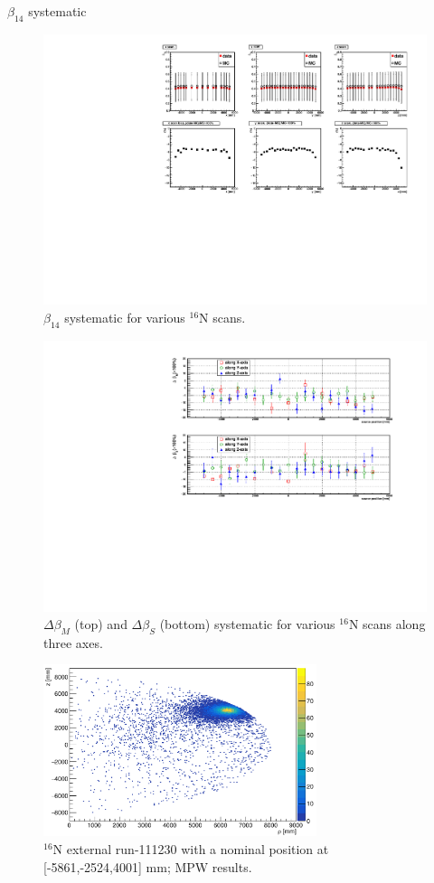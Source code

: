 $\beta_{14}$ systematic
\begin{figure}[htbp]
	\centering
	\includegraphics[width=15cm]{beta14_allScans.pdf}
	\caption{$\beta_{14}$ systematic for various $^{16}$N scans.}
	\label{beta14_scans}
\end{figure}

\begin{figure}[htbp]
	\centering
	\includegraphics[width=16cm]{angularResol_scanXYZ.pdf}
	\caption{$\Delta\beta_{M}$ (top) and $\Delta\beta_{S}$ (bottom) systematic for various $^{16}$N scans along three axes.}
	\label{xyzScans}
\end{figure}

\begin{figure}[!htb]
	\centering
	\includegraphics[width=8cm]{N16_external_111230_rhoZ.png}
	\caption{$^{16}$N external run-111230 with a nominal position at [-5861,-2524,4001] mm; MPW results.}
	\label{16Nexternal}
\end{figure}

